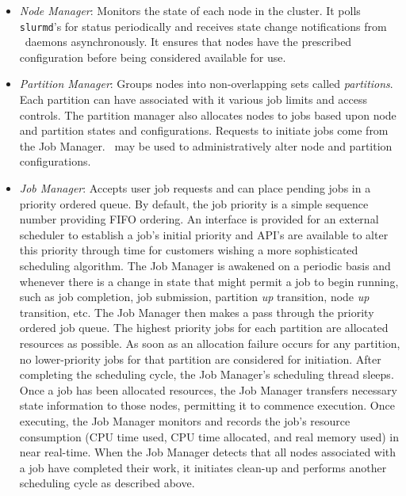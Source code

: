 \begin{itemize}
\item {\em Node Manager}: Monitors the state of each node in
the cluster.  It polls {\tt slurmd}'s for status periodically and
receives state change notifications from \slurmd\ daemons asynchronously.
It ensures that nodes have the prescribed configuration before being 
considered available for use.

\item {\em Partition Manager}: Groups nodes into non-overlapping sets called
{\em partitions}. Each partition can have associated with it various job
limits and access controls.  The partition manager also allocates nodes
to jobs based upon node and partition states and configurations. Requests
to initiate jobs come from the Job Manager.  \scontrol\ may be used
to administratively alter node and partition configurations.

\item {\em Job Manager}: Accepts user job requests and can
place pending jobs in a priority ordered queue. By default, the job
priority is a simple sequence number providing FIFO ordering.
An interface is provided for an external scheduler to establish a job's
initial priority and API's are available to alter this priority through
time for customers wishing a more sophisticated scheduling algorithm.
The Job Manager is awakened on a periodic basis and whenever there
is a change in state that might permit a job to begin running, such
as job completion, job submission, partition {\em up} transition,
node {\em up} transition, etc.  The Job Manager then makes a pass
through the priority ordered job queue. The highest priority jobs 
for each partition are allocated resources as possible. As soon as an 
allocation failure occurs for any partition, no lower-priority jobs for 
that partition are considered for initiation. 
After completing the scheduling cycle, the Job Manager's scheduling
thread sleeps.  Once a job has been allocated resources, the Job Manager
transfers necessary state information to those nodes, permitting it 
to commence execution.  Once executing, the Job Manager monitors and records
the job's resource consumption (CPU time used, CPU time allocated, and
real memory used) in near real-time.  When the Job Manager detects that
all nodes associated with a job have completed their work, it initiates
clean-up and performs another scheduling cycle as described above.


\end{itemize}

